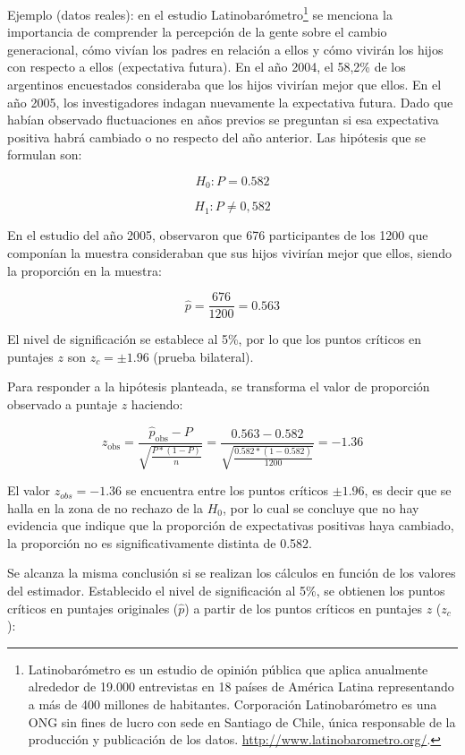 \documentclass[]{book}
\let\rmarkdownfootnote\footnote%
\def\footnote{\protect\rmarkdownfootnote}
\begin{document}
Ejemplo (datos reales): en el estudio Latinobarómetro\footnote{Latinobarómetro es un estudio de opinión pública que aplica anualmente alrededor de 19.000 entrevistas en 18 países de América Latina representando a más de 400 millones de habitantes. Corporación Latinobarómetro es una ONG sin fines de lucro con sede en Santiago de Chile, única responsable de la producción y publicación de los datos. \url{http://www.latinobarometro.org/}.} se menciona
la importancia de comprender la percepción de la gente sobre el cambio
generacional, cómo vivían los padres en relación a ellos y cómo vivirán
los hijos con respecto a ellos (expectativa futura). En el año 2004, el
58,2\% de los argentinos encuestados consideraba que los hijos vivirían
mejor que ellos. En el año 2005, los investigadores indagan nuevamente
la expectativa futura. Dado que habían observado fluctuaciones en años
previos se preguntan si esa expectativa positiva habrá cambiado o no
respecto del año anterior. Las hipótesis que se formulan son:

\[H_{0}:P = 0.582\]

\[H_{1}:P \neq 0,582\]

En el estudio del año 2005, observaron que 676 participantes de los 1200
que componían la muestra consideraban que sus hijos vivirían mejor que
ellos, siendo la proporción en la muestra:

\[\widehat{p} = \frac{676}{1200} = 0.563\]

El nivel de significación se establece al 5\%, por lo que los puntos
críticos en puntajes \(z\) son \(z_{c}=\pm1.96\) (prueba bilateral).

Para responder a la hipótesis planteada, se transforma el valor de
proporción observado a puntaje \(z\) haciendo:

\[z_{\text{obs}} = \frac{{\widehat{p}}_{\text{obs}} - P}{\sqrt{\frac{P*(1 - P)}{n}}} = \frac{0.563 - 0.582}{\sqrt{\frac{0.582*(1 - 0.582)}{1200}}} = - 1.36\]

El valor \(z_{obs}=-1.36\) se encuentra entre los puntos críticos \(\pm1.96\), es decir que se halla en la zona de no rechazo de la \(H_{0}\), por lo cual
se concluye que no hay evidencia que indique que la proporción de
expectativas positivas haya cambiado, la proporción no es
significativamente distinta de 0.582.

Se alcanza la misma conclusión si se realizan los cálculos en función de
los valores del estimador. Establecido el nivel de significación al 5\%,
se obtienen los puntos críticos en puntajes originales (\(\widehat{p}\)) a
partir de los puntos críticos en puntajes \(z\) (\(z_{c}\)):
\end{document}
